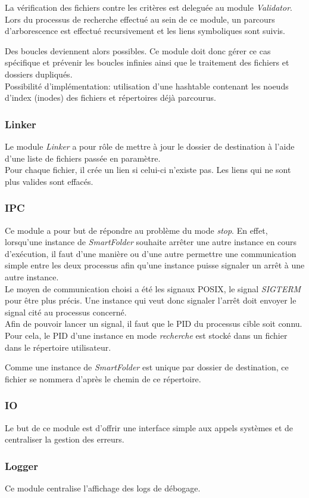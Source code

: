 \documentclass[11pt, a4paper]{article}
\begin{document}
La vérification des fichiers contre les critères est deleguée au module \textit{Validator}.\\

Lors du processus de recherche effectué au sein de ce module, un parcours d'arborescence est effectué recursivement et les liens symboliques sont suivis.

Des boucles deviennent alors possibles. Ce module doit donc gérer ce cas spécifique et prévenir les boucles infinies ainsi que le traitement des fichiers et dossiers dupliqués. \\

Possibilité d'implémentation: utilisation d'une hashtable contenant les noeuds d'index (inodes) des fichiers et répertoires déjà parcourus.

\subsubsection{Linker}
Le module \textit{Linker} a pour rôle de mettre à jour le dossier de destination
à l'aide d'une liste de fichiers passée en paramètre. \\

Pour chaque fichier, il crée un lien si celui-ci n'existe pas. Les liens qui ne sont plus valides sont effacés.

\subsubsection{IPC}
\label{sec:ipc}
Ce module a pour but de répondre au problème du mode \textit{stop}.
En effet, lorsqu'une instance de \textit{SmartFolder} souhaite arrêter une autre instance en cours d'exécution,
il faut d'une manière ou d'une autre permettre une communication simple entre les deux processus afin
qu'une instance puisse signaler un arrêt à une autre instance. \\

Le moyen de communication choisi a été les signaux POSIX, le signal \textit{SIGTERM} pour être plus précis.
Une instance qui veut donc signaler l'arrêt doit envoyer le signal cité au processus concerné. \\

Afin de pouvoir lancer un signal, il faut que le PID du processus cible soit connu.
Pour cela, le PID d'une instance en mode \textit{recherche} est stocké dans un fichier
dans le répertoire utilisateur.

Comme une instance de \textit{SmartFolder} est unique par dossier de destination,
ce fichier se nommera d'après le chemin de ce répertoire.

\subsubsection{IO}
Le but de ce module est d'offrir une interface simple aux appels systèmes et de centraliser la gestion des erreurs.

\subsubsection{Logger}
Ce module centralise l'affichage des logs de débogage.
\end{document}
